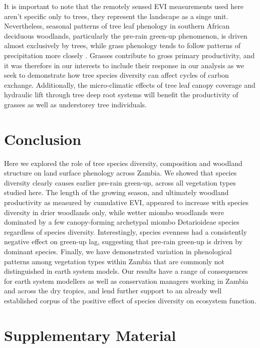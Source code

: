 \begin{refsection}
It is important to note that the remotely sensed EVI measurements used here aren't specific only to trees, they represent the landscape as a singe unit. Nevertheless, seasonal patterns of tree leaf phenology in southern African deciduous woodlands, particularly the pre-rain green-up phenomenon, is driven almost exclusively by trees, while grass phenology tends to follow patterns of precipitation more closely \citep{Whitecross2017, Archibald2007, Higgins2011}. Grasses contribute to gross primary productivity, and it was therefore in our interests to include their response in our analysis as we seek to demonstrate how tree species diversity can affect cycles of carbon exchange. Additionally, the micro-climatic effects of tree leaf canopy coverage and hydraulic lift through tree deep root systems will benefit the productivity of grasses as well as understorey tree individuals.

\section{Conclusion}
\label{phen:sec:conclusion}

Here we explored the role of tree species diversity, composition and woodland structure on land surface phenology across Zambia. We showed that species diversity clearly causes earlier pre-rain green-up, across all vegetation types studied here. The length of the growing season, and ultimately woodland productivity as measured by cumulative EVI, appeared to increase with species diversity in drier woodlands only, while wetter miombo woodlands were dominated by a few canopy-forming archetypal miombo Detarioideae species regardless of species diversity. Interestingly, species evenness had a consistently negative effect on green-up lag, suggesting that pre-rain green-up is driven by dominant species. Finally, we have demonstrated variation in phenological patterns among vegetation types within Zambia that are commonly not distinguished in earth system models. Our results have a range of consequences for earth system modellers as well as conservation managers working in Zambia and across the dry tropics, and lend further support to an already well established corpus of the positive effect of species diversity on ecosystem function.

\newpage{}
\FloatBarrier{}
\begingroup
{}
\printbibliography[heading=subbibintoc]
\endgroup

\section{Supplementary Material}
\label{phen:sec:supp}
\begin{supplement} 


\end{supplement}
\end{refsection}
